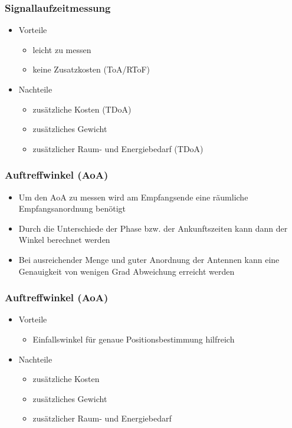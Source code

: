 \begin{frame}
\frametitle{Signallaufzeitmessung}
\begin{itemize}
  \item Vorteile
  \begin{itemize}
    \item leicht zu messen 
    \item keine Zusatzkosten (ToA/RToF)
  \end{itemize}
  \item Nachteile
  \begin{itemize}
    \item zusätzliche Kosten (TDoA)
    \item zusätzliches Gewicht 
    \item zusätzlicher Raum- und Energiebedarf (TDoA)
  \end{itemize}
\end{itemize}
\end{frame}

\begin{frame}
\frametitle{Auftreffwinkel (AoA)}
\begin{itemize}
  \item Um den AoA zu messen wird am Empfangsende eine räumliche Empfangsanordnung benötigt
  \item Durch die Unterschiede der Phase bzw. der Ankunftszeiten kann dann der Winkel berechnet werden
  \item Bei ausreichender Menge und guter Anordnung der Antennen kann eine Genauigkeit von wenigen Grad Abweichung erreicht werden
\end{itemize}
\end{frame}

\begin{frame}
\frametitle{Auftreffwinkel (AoA)}
\begin{itemize}
  \item Vorteile
  \begin{itemize}
    \item Einfallswinkel für genaue Positionsbestimmung hilfreich
  \end{itemize}
  \item Nachteile
  \begin{itemize}
    \item zusätzliche Kosten
    \item zusätzliches Gewicht
    \item zusätzlicher Raum- und Energiebedarf
  \end{itemize}
\end{itemize}
\end{frame}
